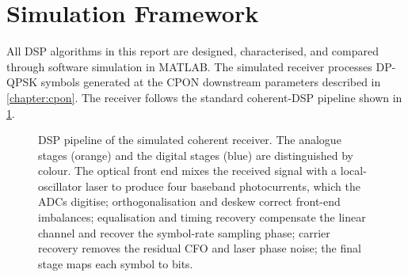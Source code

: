 \documentclass[12pt,a4paper]{report}
\begin{document}
\section{Simulation Framework}
All DSP algorithms in this report are designed, characterised, and compared through software simulation in MATLAB. The simulated receiver processes DP-QPSK symbols generated at the CPON downstream parameters described in \cref{chapter:cpon}. The receiver follows the standard coherent-DSP pipeline shown in \cref{fig:receiver_pipeline}.

\begin{figure}[H]
    \centering
    \caption{DSP pipeline of the simulated coherent receiver. The analogue stages (orange) and the digital stages (blue) are distinguished by colour. The optical front end mixes the received signal with a local-oscillator laser to produce four baseband photocurrents, which the ADCs digitise; orthogonalisation and deskew correct front-end imbalances; equalisation and timing recovery compensate the linear channel and recover the symbol-rate sampling phase; carrier recovery removes the residual CFO and laser phase noise; the final stage maps each symbol to bits.}
    \label{fig:receiver_pipeline}
\end{figure}
\end{document}
